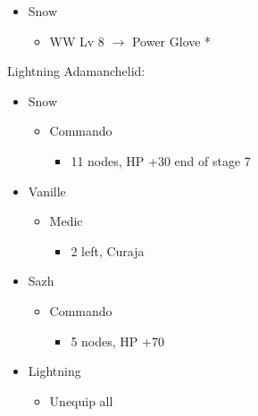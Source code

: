 \begin{multicols}{2}
\begin{menu}
\begin{itemize}
    \equip
    \begin{itemize}
        \item Snow
        \begin{itemize}
            \item WW Lv 8 $\rightarrow$ Power Glove *
        \end{itemize}
    \end{itemize}
\end{itemize}
\end{menu}
\vfill
\columnbreak
\begin{center}
Lightning Adamanchelid:
\end{center}
\begin{menu}
\begin{itemize}
    \crystarium
    \begin{itemize}
        \item Snow
        \begin{itemize}
            \item Commando
            \begin{itemize}
                \item 11 nodes, HP +30 end of stage 7
            \end{itemize}
        \end{itemize}
        \item Vanille
        \begin{itemize}
            \item Medic
            \begin{itemize}
                \item 2 left, Curaja
            \end{itemize}
        \end{itemize}
        \item Sazh
        \begin{itemize}
            \item Commando
            \begin{itemize}
                \item 5 nodes, HP +70
            \end{itemize}
        \end{itemize}
    \end{itemize}
    \equip
    \begin{itemize}
        \item Lightning
        \begin{itemize}
            \item Unequip all
        \end{itemize}

\end{itemize}
\end{itemize}
\end{menu}
\end{multicols}
